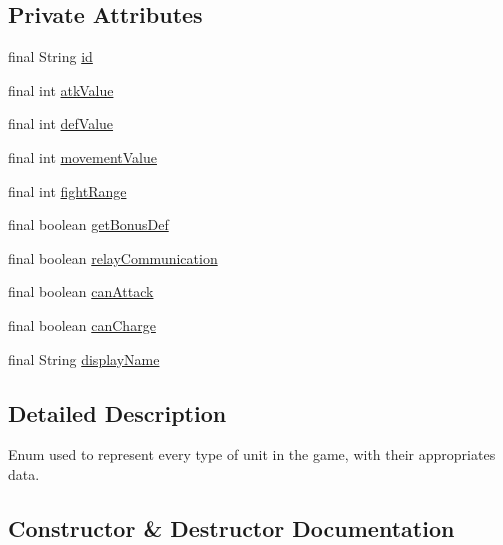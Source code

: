 \subsection*{Private Attributes}
\begin{DoxyCompactItemize}
\item 
final String \mbox{\hyperlink{enumrule_engine_1_1entity_1_1_e_unit_property_a9dc3ae182f33d6ee2032b5ad42da3d15}{id}}
\item 
final int \mbox{\hyperlink{enumrule_engine_1_1entity_1_1_e_unit_property_a22220c11eb06c22476d23a04b199af49}{atk\+Value}}
\item 
final int \mbox{\hyperlink{enumrule_engine_1_1entity_1_1_e_unit_property_ad716330ef5e0995a31421a4f80c166af}{def\+Value}}
\item 
final int \mbox{\hyperlink{enumrule_engine_1_1entity_1_1_e_unit_property_ac40b31cd8f4b164ae44cd6e26643efe5}{movement\+Value}}
\item 
final int \mbox{\hyperlink{enumrule_engine_1_1entity_1_1_e_unit_property_ab6df504e178d635a9eef1f30dbd25f71}{fight\+Range}}
\item 
final boolean \mbox{\hyperlink{enumrule_engine_1_1entity_1_1_e_unit_property_a2a56f4096a71df5bd12abe26786b2609}{get\+Bonus\+Def}}
\item 
final boolean \mbox{\hyperlink{enumrule_engine_1_1entity_1_1_e_unit_property_a327353bae2af8325edf677527355219c}{relay\+Communication}}
\item 
final boolean \mbox{\hyperlink{enumrule_engine_1_1entity_1_1_e_unit_property_aa73042ddcfa87f1d2212895f2b991ceb}{can\+Attack}}
\item 
final boolean \mbox{\hyperlink{enumrule_engine_1_1entity_1_1_e_unit_property_a8d633a4666dd2864331ed62f72cf7dbc}{can\+Charge}}
\item 
final String \mbox{\hyperlink{enumrule_engine_1_1entity_1_1_e_unit_property_a3d90c16596a005efe95099d12ae7da1d}{display\+Name}}
\end{DoxyCompactItemize}


\subsection{Detailed Description}
Enum used to represent every type of unit in the game, with their appropriates data. 

\subsection{Constructor \& Destructor Documentation}
\mbox{\label{enumrule_engine_1_1entity_1_1_e_unit_property_adb237a99b37dfcbde17cd6dbb5abd449}} 
